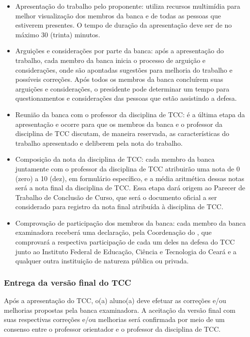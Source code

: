 \begin{itemize}
	\item Apresentação do trabalho pelo proponente: utiliza recursos multimídia para melhor visualização dos membros da banca e de todas as pessoas que estiverem presentes. O tempo de duração da apresentação deve ser de no máximo 30 (trinta) minutos.
	\item Arguições e considerações por parte da banca: após a apresentação do trabalho, cada membro da banca inicia o processo de arguição e considerações, onde são apontadas sugestões para melhoria do trabalho e possíveis correções. Após todos os membros da banca concluírem suas arguições e considerações, o presidente pode determinar um tempo para questionamentos e considerações das pessoas que estão assistindo a defesa.
	\item Reunião da banca com o professor da disciplina de TCC: é a última etapa da apresentação e ocorre para que os membros da banca e o professor da disciplina de TCC discutam, de maneira reservada, as características do trabalho apresentado e deliberem pela nota do trabalho.
	\item Composição da nota da disciplina de TCC: cada membro da banca juntamente com o professor da disciplina de TCC atribuirão uma nota de 0 (zero) a 10 (dez), em formulário específico, e a média aritmética dessas notas será a nota final da disciplina de TCC. Essa etapa dará origem ao Parecer de Trabalho de Conclusão de Curso, que será o documento oficial a ser considerado para registro da nota final atribuída à disciplina de TCC.
	\item Comprovação de participação dos membros da banca: cada membro da banca examinadora receberá uma declaração, pela Coordenação do \NOMECURSO, que comprovará a respectiva participação de cada um deles na defesa do TCC junto ao Instituto Federal de Educação, Ciência e Tecnologia do Ceará e a qualquer outra instituição de natureza pública ou privada.
\end{itemize}

\subsubsection{Entrega da versão final do TCC}

Após a apresentação do TCC, o(a) aluno(a) deve efetuar as correções e/ou melhorias propostas pela banca examinadora. A aceitação da versão final com suas respectivas correções e/ou melhorias será confirmada por meio de um consenso entre o professor orientador e o professor da disciplina de TCC.


